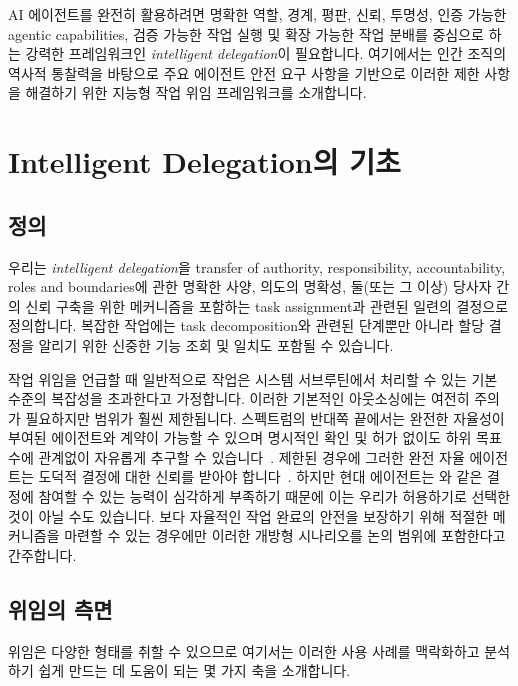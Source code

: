 \documentclass[11pt, a4paper, twocolumn, copyright, goog]{google}
\begin{document}
AI 에이전트를 완전히 활용하려면 명확한 역할, 경계, 평판, 신뢰, 투명성, 인증 가능한 agentic capabilities, 검증 가능한 작업 실행 및 확장 가능한 작업 분배를 중심으로 하는 강력한 프레임워크인 \emph{intelligent delegation}이 필요합니다. 여기에서는 인간 조직의 역사적 통찰력을 바탕으로 주요 에이전트 안전 요구 사항을 기반으로 이러한 제한 사항을 해결하기 위한 지능형 작업 위임 프레임워크를 소개합니다.

\section{Intelligent Delegation의 기초}
\label{sec:foundations}

\subsection{정의}

우리는 \emph{intelligent delegation}을 transfer of authority, responsibility, accountability, roles and boundaries에 관한 명확한 사양, 의도의 명확성, 둘(또는 그 이상) 당사자 간의 신뢰 구축을 위한 메커니즘을 포함하는 task assignment과 관련된 일련의 결정으로 정의합니다. 복잡한 작업에는 task decomposition와 관련된 단계뿐만 아니라 할당 결정을 알리기 위한 신중한 기능 조회 및 일치도 포함될 수 있습니다.

작업 위임을 언급할 때 일반적으로 작업은 시스템 서브루틴에서 처리할 수 있는 기본 수준의 복잡성을 초과한다고 가정합니다. 이러한 기본적인 아웃소싱에는 여전히 주의가 필요하지만 범위가 훨씬 제한됩니다. 스펙트럼의 반대쪽 끝에서는 완전한 자율성이 부여된 에이전트와 계약이 가능할 수 있으며 명시적인 확인 및 허가 없이도 하위 목표 수에 관계없이 자유롭게 추구할 수 있습니다~\citep{kasirzadeh2025characterizingaiagentsalignment}. 제한된 경우에 그러한 완전 자율 에이전트는 도덕적 결정에 대한 신뢰를 받아야 합니다~\citep{sloksnath2025delegating}. 하지만 현대 에이전트는 \citep{haas2020moral, mao2023doing, reinecke2023puzzle}와 같은 결정에 참여할 수 있는 능력이 심각하게 부족하기 때문에 이는 우리가 허용하기로 선택한 것이 아닐 수도 있습니다. 보다 자율적인 작업 완료의 안전을 보장하기 위해 적절한 메커니즘을 마련할 수 있는 경우에만 이러한 개방형 시나리오를 논의 범위에 포함한다고 간주합니다.

\subsection{위임의 측면}

위임은 다양한 형태를 취할 수 있으므로 여기서는 이러한 사용 사례를 맥락화하고 분석하기 쉽게 만드는 데 도움이 되는 몇 가지 축을 소개합니다.
\end{document}
